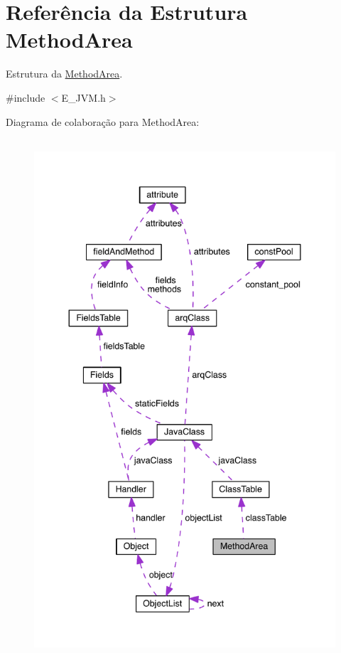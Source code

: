 \hypertarget{struct_method_area}{}\section{Referência da Estrutura Method\+Area}
\label{struct_method_area}


Estrutura da \hyperlink{struct_method_area}{Method\+Area}.  




{\ttfamily \#include $<$E\+\_\+\+J\+V\+M.\+h$>$}



Diagrama de colaboração para Method\+Area\+:
\nopagebreak
\begin{figure}[H]
\begin{center}
\leavevmode
\includegraphics[height=550pt]{struct_method_area__coll__graph}
\end{center}
\end{figure}
